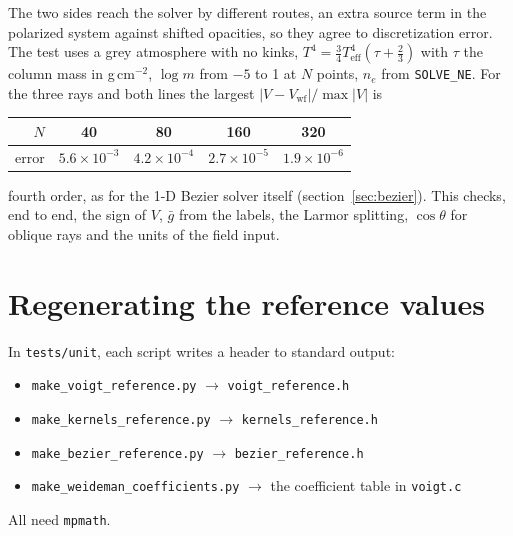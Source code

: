 \documentclass[11pt,a4paper]{article}
\newcommand{\code}[1]{\texttt{#1}}
\begin{document}
The two sides reach the solver by different routes, an extra source term
in the polarized system against shifted opacities, so they agree to
discretization error. The test uses a grey atmosphere with no kinks,
$T^4=\tfrac34T_\text{eff}^4(\tau+\tfrac23)$ with $\tau$ the column mass in
g\,cm$^{-2}$, $\log m$ from $-5$ to 1 at $N$ points, $n_e$ from
\code{SOLVE\_NE}. For the three rays and both lines the largest
$|V-V_\text{wf}|/\max|V|$ is
\begin{center}
\begin{tabular}{rcccc}
\toprule
$N$ & 40 & 80 & 160 & 320\\
\midrule
error & $5.6\times10^{-3}$ & $4.2\times10^{-4}$ & $2.7\times10^{-5}$ &
$1.9\times10^{-6}$\\
\bottomrule
\end{tabular}
\end{center}
fourth order, as for the 1-D Bezier solver itself
(section~\ref{sec:bezier}). This checks, end to end, the sign of $V$,
$\bar g$ from the labels, the Larmor splitting, $\cos\theta$ for oblique
rays and the units of the field input.

\section*{Regenerating the reference values}
In \code{tests/unit}, each script writes a header to standard output:
\begin{itemize}
\item \code{make\_voigt\_reference.py} $\to$ \code{voigt\_reference.h}
\item \code{make\_kernels\_reference.py} $\to$ \code{kernels\_reference.h}
\item \code{make\_bezier\_reference.py} $\to$ \code{bezier\_reference.h}
\item \code{make\_weideman\_coefficients.py} $\to$ the coefficient table
  in \code{voigt.c}
\end{itemize}
All need \code{mpmath}.



\end{document}
